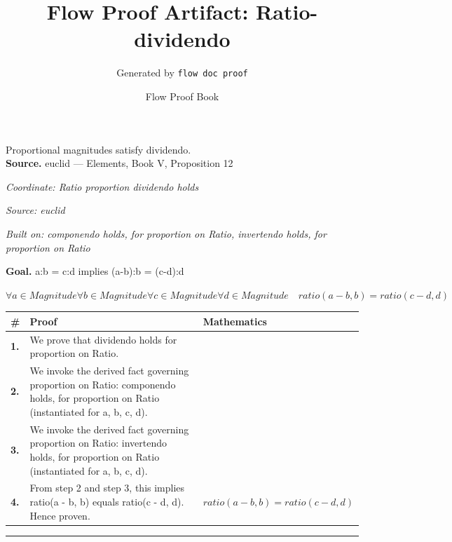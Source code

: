 \documentclass[11pt]{article}
\title{Flow Proof Artifact: Ratio-dividendo}
\author{Generated by \texttt{flow doc proof}}
\date{Flow Proof Book}
\theoremstyle{definition}
\begin{document}
\maketitle
Proportional magnitudes satisfy dividendo.\\[0.5em]
\textbf{Source.} euclid — Elements, Book V, Proposition 12\\[0.5em]
\bigskip
{}\par
\smallskip\noindent\textit{Coordinate: Ratio \cdot proportion \cdot dividendo holds}\par
\smallskip\noindent\textit{Source: euclid}\par
\smallskip\noindent\textit{Built on: componendo holds, for proportion on Ratio, invertendo holds, for proportion on Ratio}\par
\medskip
\noindent\textbf{Goal.} a:b = c:d implies (a-b):b = (c-d):d\par
\noindent$\displaystyle \forall a \in Magnitude \forall b \in Magnitude \forall c \in Magnitude \forall d \in Magnitude\quad ratio(a - b, b) = ratio(c - d, d)$\par
\medskip
\noindent
\begin{tabular}{@{} >{\raggedright\arraybackslash}p{} >{\raggedright\arraybackslash}p{} >{\raggedleft\arraybackslash}p{} @{}}
\textbf{\#} & \textbf{Proof} & \textbf{Mathematics} \\
\midrule
\textbf{1.} & We prove that dividendo holds for proportion on Ratio. & \\[0.45em]
\textbf{2.} & We invoke the derived fact governing proportion on Ratio: componendo holds, for proportion on Ratio (instantiated for a, b, c, d). & \\[0.45em]
\textbf{3.} & We invoke the derived fact governing proportion on Ratio: invertendo holds, for proportion on Ratio (instantiated for a, b, c, d). & \\[0.45em]
\textbf{4.} & From step 2 and step 3, this implies ratio(a - b, b) equals ratio(c - d, d). Hence proven. & $\displaystyle ratio(a - b, b) = ratio(c - d, d)$ \\[0.45em]
\bottomrule
\end{tabular}
\label{thm:Ratio-proportion-dividendo_holds}
\par\medskip\hrule
\end{document}
